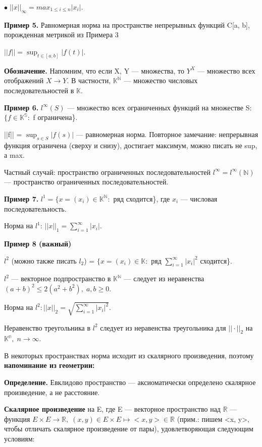\documentclass[12pt,a4paper]{article}
\begin{document}
$\bullet \; ||x||_{\infty} = max_{1 \leqslant i \leqslant n}|x_{i}|$. 

\textbf{Пример 5.} Равномерная норма на пространстве непрерывных функций C[a, b], порожденная метрикой из Примера 3

$||f|| = \sup_{t \in [a, b]}|f(t)|.$

\textbf{Обозначение.} Напомним, что если X, Y --- множества, то $Y^{X}$ --- множество всех отображений $X \to Y$. В частности, $\mathbb{K^N}$ --- множество числовых последовательностей в $\mathbb{K}$. 

\textbf{Пример 6.} $l^{\infty}(S)$ --- множество всех ограниченных функций на множестве S: $\{f \in \mathbb{K^S}:$ f ограничена\}. 

||f|| = $\sup_{s \in S} |f(s)|$ --- равномерная норма. Повторное замечание: непрерывная функция ограничена (сверху и снизу), достигает максимум, можно писать не sup, а max. 

Частный случай: пространство ограниченных последовательностей $l^{\infty} = l^{\infty}(\mathbb{N})$ --- пространство ограниченных последовательностей. 

\textbf{Пример 7.} $l^{1} = \{x = (x_{i}) \in \mathbb{K^N}:$ ряд сходится\}, где $x_{i}$ --- числовая последовательность. 

Норма на $l^{1}$: $||x||_{1} = \sum_{i = 1}^{\infty}|x_{i}|.$ 

\textbf{Пример 8 (важный)}

$l^{2}$ (можно также писать $l_{2}$) = $\{x = (x_{i}) \in \mathbb{K}:$ ряд $\sum_{i = 1}^{\infty} |x_{i}|^2$ сходится\}. 

$l^{2}$ --- векторное подпространство в $\mathbb{K^N}$ --- следует из неравенства $(a + b)^2 \leqslant 2(a^2 + b^2), \; a, b \geqslant 0.$

Норма на $l^2: ||x||_{2} = \sqrt{\sum_{i = 1}^{\infty}|x_{i}|^2}.$ 

Неравенство треугольника в $l^{2}$ следует из неравенства треугольника для $|| \cdot ||_{2}$ на $\mathbb{K^n}, \; n \to \infty.$

В некоторых пространствах норма исходит из скалярного произведения, поэтому  \textbf{напоминание из геометрии:}

\textbf{Определение.} Евклидово пространство --- аксиоматически определено скалярное произведение, а не расстояние. 

\textbf{Скалярное произведение} на E, где E --- векторное пространство над $\mathbb{R}$ --- функция $E \times E \to \mathbb{R}, \; (x, y) \in E \times E \mapsto <x, y> \in \mathbb{R}$ (прим.: пишем <x, y>, чтобы отличать скалярное произведение от пары), удовлетворяющая следующим условиям: 
\end{document}
